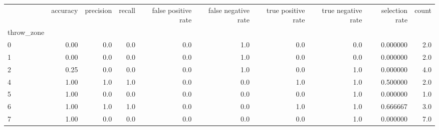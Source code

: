\begin{tabular}{lrrrrrrrrr}
\toprule
{} &  accuracy &  precision &  recall &  false positive rate &  false negative rate &  true positive rate &  true negative rate &  selection rate &  count \\
throw\_zone &           &            &         &                      &                      &                     &                     &                 &        \\
\midrule
0          &      0.00 &        0.0 &     0.0 &                  0.0 &                  1.0 &                 0.0 &                 0.0 &        0.000000 &    2.0 \\
1          &      0.00 &        0.0 &     0.0 &                  0.0 &                  1.0 &                 0.0 &                 0.0 &        0.000000 &    2.0 \\
2          &      0.25 &        0.0 &     0.0 &                  0.0 &                  1.0 &                 0.0 &                 1.0 &        0.000000 &    4.0 \\
4          &      1.00 &        1.0 &     1.0 &                  0.0 &                  0.0 &                 1.0 &                 1.0 &        0.500000 &    2.0 \\
5          &      1.00 &        0.0 &     0.0 &                  0.0 &                  0.0 &                 0.0 &                 1.0 &        0.000000 &    1.0 \\
6          &      1.00 &        1.0 &     1.0 &                  0.0 &                  0.0 &                 1.0 &                 1.0 &        0.666667 &    3.0 \\
7          &      1.00 &        0.0 &     0.0 &                  0.0 &                  0.0 &                 0.0 &                 1.0 &        0.000000 &    7.0 \\
\bottomrule
\end{tabular}
